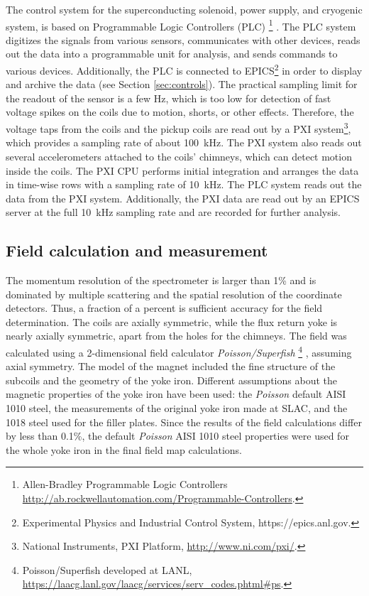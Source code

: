 The control system for the superconducting solenoid, power supply, 
and cryogenic system, is based on Programmable Logic
Controllers (PLC)%
\footnote{
  Allen-Bradley Programmable Logic Controllers
  \url{http://ab.rockwellautomation.com/Programmable-Controllers}.
}%
.
The PLC system digitizes the signals from various sensors, communicates with
other devices, reads out the data into a programmable unit for
analysis, and sends commands to various devices. Additionally, the PLC is
connected to EPICS\footnote{Experimental Physics and 
Industrial Control System, https://epics.anl.gov.} in order to display and archive the data (see
Section \ref{sec:controls}).  The practical sampling limit for the readout of the sensor
is a few Hz, which is too low for
detection of fast voltage spikes on the coils due to motion, shorts,
or other effects. Therefore, the voltage taps from the coils and the pickup coils are read
out by a PXI system\footnote{
  National Instruments, PXI Platform, \url{http://www.ni.com/pxi/}.
}, which provides a sampling rate of about 100~kHz. The
PXI system also reads out several accelerometers attached to the
coils' chimneys, which can detect motion inside the coils. The PXI
CPU performs initial integration and arranges the data in time-wise
rows with a sampling rate of 10~kHz.  The PLC system reads out the
data from the PXI system. Additionally, the PXI data are read out by
an EPICS server at the full 10~kHz sampling rate and are recorded for further analysis.

\subsection[Field calculation and measurement]{
         Field calculation and measurement
        \label{sec:sol:field}
}

The momentum resolution of the \gx{} spectrometer is larger than
1\% and is dominated by multiple scattering and the spatial
resolution of the coordinate detectors.  Thus, a fraction of a percent is
sufficient accuracy for the field determination.  The coils are
axially symmetric, while the flux return yoke is nearly axially
symmetric, apart from the holes for the chimneys. The field was
calculated using a 2-dimensional field calculator {\it
  Poisson/Superfish}%
\footnote{
   Poisson/Superfish developed at LANL,
   \url{https://laacg.lanl.gov/laacg/services/serv_codes.phtml\#ps}.
} 
, assuming axial symmetry.  The model of the magnet included the
fine structure of the subcoils and the geometry of the yoke
iron. Different assumptions about the magnetic properties of the yoke
iron have been used: the {\it Poisson} default AISI 1010 steel, the
measurements of the original yoke iron made at SLAC, and the 1018
steel used for the filler plates. Since the results of the field
calculations differ by less than 0.1\%, the default {\it Poisson} AISI
1010 steel properties were used for the whole yoke iron in the final
field map calculations.

